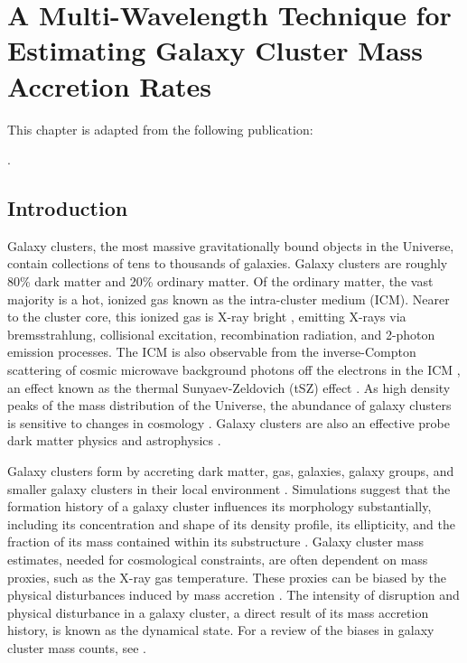 \chapter{A Multi-Wavelength Technique for Estimating Galaxy Cluster Mass Accretion Rates} \label{chap:chap-4}


\begin{singlespace}         %
    This chapter is adapted from the following publication:
    
    . 
\end{singlespace} 

\section{Introduction}\label{Ch4_introduction}

Galaxy clusters, the most massive gravitationally bound objects in the Universe, contain collections of tens to thousands of galaxies. Galaxy clusters are roughly 80\% dark matter and 20\% ordinary matter. Of the ordinary matter, the vast majority is a hot, ionized gas known as the intra-cluster medium (ICM). Nearer to the cluster core, this ionized gas is X-ray bright \cite[e.g.,][]{Bulbul_2024}, emitting X-rays via bremsstrahlung, collisional excitation, recombination radiation, and 2-photon emission processes. The ICM is also observable from the inverse-Compton scattering of cosmic microwave background photons off the electrons in the ICM \cite[e.g.,][]{Hilton_2021}, an effect known as the thermal Sunyaev-Zeldovich (tSZ) effect \cite{SZ_1972}. As high density peaks of the mass distribution of the Universe, the abundance of galaxy clusters is sensitive to changes in cosmology \cite[e.g.,][]{eROSITA_Cluster_Abundances_2024}. Galaxy clusters are also an effective probe dark matter physics \cite[e.g.,][]{Andrade_2022} and astrophysics \cite[e.g.,][]{Fournier_2024}.

Galaxy clusters form by accreting dark matter, gas, galaxies, galaxy groups, and smaller galaxy clusters in their local environment \cite[for a review, see][]{Kravtsov_2012}. Simulations suggest that the formation history of a galaxy cluster influences its morphology substantially, including its concentration and shape of its density profile, its ellipticity, and the fraction of its mass contained within its substructure \cite[e.g.,][]{Wong_2012, Diemer_2014, Jiang_2016, Chen_2019, Lau_2021, Mendoza_2023}. Galaxy cluster mass estimates, needed for cosmological constraints, are often dependent on mass proxies, such as the X-ray gas temperature. These proxies can be biased by the physical disturbances induced by mass accretion \cite[e.g.,][]{Lau_2015, Lee_2023, Zhuravleva_2023}. The intensity of disruption and physical disturbance in a galaxy cluster, a direct result of its mass accretion history, is known as the dynamical state. For a review of the biases in galaxy cluster mass counts, see \cite{Pratt_2019}.

